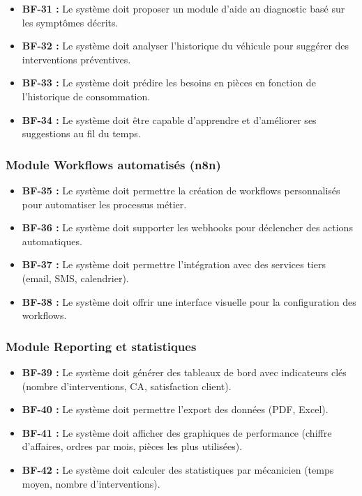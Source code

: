\begin{itemize}
    \item \textbf{BF-31 :} Le système doit proposer un module d'aide au diagnostic basé sur les symptômes décrits.
    
    \item \textbf{BF-32 :} Le système doit analyser l'historique du véhicule pour suggérer des interventions préventives.
    
    \item \textbf{BF-33 :} Le système doit prédire les besoins en pièces en fonction de l'historique de consommation.
    
    \item \textbf{BF-34 :} Le système doit être capable d'apprendre et d'améliorer ses suggestions au fil du temps.
\end{itemize}

\subsubsection{Module Workflows automatisés (n8n)}

\begin{itemize}
    \item \textbf{BF-35 :} Le système doit permettre la création de workflows personnalisés pour automatiser les processus métier.
    
    \item \textbf{BF-36 :} Le système doit supporter les webhooks pour déclencher des actions automatiques.
    
    \item \textbf{BF-37 :} Le système doit permettre l'intégration avec des services tiers (email, SMS, calendrier).
    
    \item \textbf{BF-38 :} Le système doit offrir une interface visuelle pour la configuration des workflows.
\end{itemize}

\subsubsection{Module Reporting et statistiques}

\begin{itemize}
    \item \textbf{BF-39 :} Le système doit générer des tableaux de bord avec indicateurs clés (nombre d'interventions, CA, satisfaction client).
    
    \item \textbf{BF-40 :} Le système doit permettre l'export des données (PDF, Excel).
    
    \item \textbf{BF-41 :} Le système doit afficher des graphiques de performance (chiffre d'affaires, ordres par mois, pièces les plus utilisées).
    
    \item \textbf{BF-42 :} Le système doit calculer des statistiques par mécanicien (temps moyen, nombre d'interventions).
\end{itemize}

